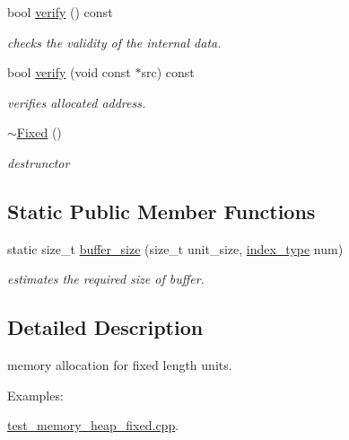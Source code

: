 \begin{DoxyCompactItemize}
bool \hyperlink{classhryky_1_1memory_1_1heap_1_1_fixed_ae411a2003a15fe4db249a988df97f9d5}{verify} () const 
\begin{DoxyCompactList}\small\item\em checks the validity of the internal data. \end{DoxyCompactList}\item 
bool \hyperlink{classhryky_1_1memory_1_1heap_1_1_fixed_a9b9899cee38766e2987d2938991c6050}{verify} (void const $\ast$src) const 
\begin{DoxyCompactList}\small\item\em verifies allocated address. \end{DoxyCompactList}\item 
\hyperlink{classhryky_1_1memory_1_1heap_1_1_fixed_abe57aea352000043830af34cf978c804}{$\sim$\-Fixed} ()
\begin{DoxyCompactList}\small\item\em destrunctor \end{DoxyCompactList}\end{DoxyCompactItemize}
\subsection*{Static Public Member Functions}
\begin{DoxyCompactItemize}
\item 
static size\-\_\-t \hyperlink{classhryky_1_1memory_1_1heap_1_1_fixed_adb07b62b615fd87ae28633a824635465}{buffer\-\_\-size} (size\-\_\-t unit\-\_\-size, \hyperlink{classhryky_1_1memory_1_1heap_1_1_fixed_a5031234bccd24fe2b2ea6ff6ae5cdcdd}{index\-\_\-type} num)
\begin{DoxyCompactList}\small\item\em estimates the required size of buffer. \end{DoxyCompactList}\end{DoxyCompactItemize}


\subsection{Detailed Description}
memory allocation for fixed length units. \begin{Desc}
\item[Examples\-: ]\par
\hyperlink{test_memory_heap_fixed_8cpp-example}{test\-\_\-memory\-\_\-heap\-\_\-fixed.\-cpp}.\end{Desc}


